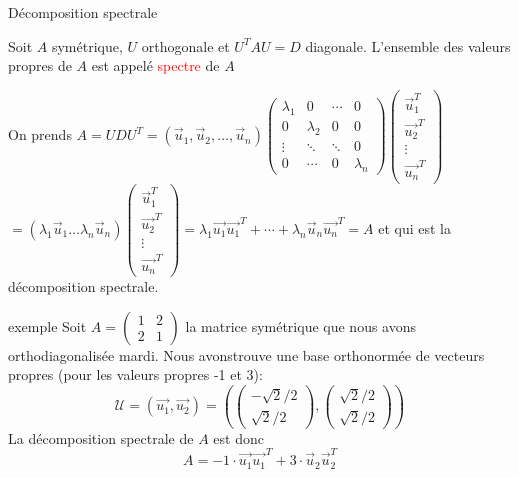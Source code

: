 \begin{parag}{Décomposition spectrale}
    \begin{definition}
        Soit $A$ symétrique, $U$ orthogonale et $U^TAU = D$ diagonale. L'ensemble des valeurs propres de $A$ est appelé \textcolor{red}{spectre} de $A$
    \end{definition}
    On prends $A =UDU^T = (\vec{u}_1, \vec{u}_2, \dots, \vec{u}_n)\begin{pmatrix}
        \lambda_1 & 0 & \cdots & 0\\
        0 & \lambda_2 & 0 & 0\\
        \vdots & \ddots & \ddots & 0\\
        0 & \cdots & 0 & \lambda_n
    \end{pmatrix}\begin{pmatrix}
        \vec{u}_1^T\\ \vec{u_2}^T\\
        \vdots \\
        \vec{u_n}^T
    \end{pmatrix}$
    \\
    $= (\lambda_1\vec{u}_1\dots\lambda_n\vec{u}_n)\begin{pmatrix}
        \vec{u}_1^T\\ \vec{u_2}^T\\
        \vdots \\
        \vec{u_n}^T
    \end{pmatrix} = \lambda_1\vec{u_1}\vec{u_1}^T + \cdots + \lambda_n\vec{u}_n\vec{u_n}^T = A$ et qui est la décomposition spectrale.
    \begin{subparag}{exemple}
        Soit $A = \begin{pmatrix}
            1 & 2 \\ 2 & 1
        \end{pmatrix}$ la matrice symétrique que nous avons orthodiagonalisée mardi. Nous avonstrouve une base orthonormée de vecteurs propres (pour les valeurs propres -1 et 3):
        \[\mathcal{U} = (\vec{u_1}, \vec{u_2}) = \left(\begin{pmatrix}
            -\sqrt{2}/2 \\
            \sqrt{2}/2
        \end{pmatrix}, \begin{pmatrix}
            \sqrt{2}/2 \\ \sqrt{2}/2
        \end{pmatrix}\right)\]
        La décomposition spectrale de $A$ est donc
        \[A = -1\cdot\vec{u_1}\vec{u_1}^T + 3\cdot\vec{u}_2\vec{u}_2^T\]
    \end{subparag}
\end{parag}


